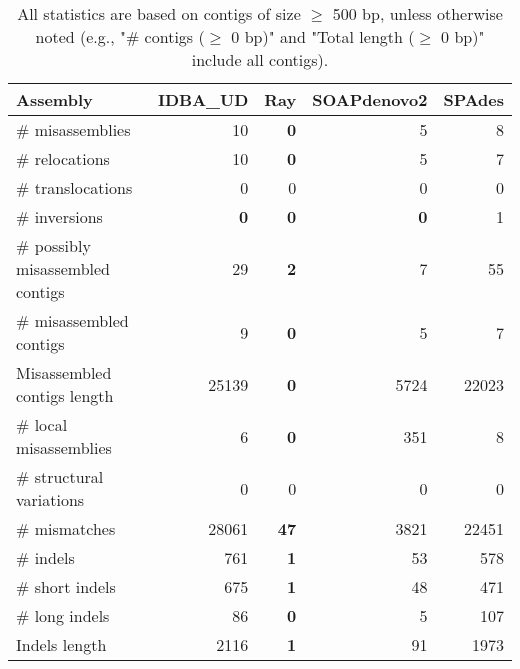 \documentclass[12pt,a4paper]{article}
\begin{document}
\begin{table}[ht]
\begin{center}
\caption{All statistics are based on contigs of size $\geq$ 500 bp, unless otherwise noted (e.g., "\# contigs ($\geq$ 0 bp)" and "Total length ($\geq$ 0 bp)" include all contigs).}
\begin{tabular}{|l*{4}{|r}|}
\hline
Assembly & IDBA\_UD & Ray & SOAPdenovo2 & SPAdes \\ \hline
\# misassemblies & 10 & {\bf 0} & 5 & 8 \\ \hline
\hspace{5mm}\# relocations & 10 & {\bf 0} & 5 & 7 \\ \hline
\hspace{5mm}\# translocations & 0 & 0 & 0 & 0 \\ \hline
\hspace{5mm}\# inversions & {\bf 0} & {\bf 0} & {\bf 0} & 1 \\ \hline
\# possibly misassembled contigs & 29 & {\bf 2} & 7 & 55 \\ \hline
\# misassembled contigs & 9 & {\bf 0} & 5 & 7 \\ \hline
Misassembled contigs length & 25139 & {\bf 0} & 5724 & 22023 \\ \hline
\# local misassemblies & 6 & {\bf 0} & 351 & 8 \\ \hline
\# structural variations & 0 & 0 & 0 & 0 \\ \hline
\# mismatches & 28061 & {\bf 47} & 3821 & 22451 \\ \hline
\# indels & 761 & {\bf 1} & 53 & 578 \\ \hline
\hspace{5mm}\# short indels & 675 & {\bf 1} & 48 & 471 \\ \hline
\hspace{5mm}\# long indels & 86 & {\bf 0} & 5 & 107 \\ \hline
Indels length & 2116 & {\bf 1} & 91 & 1973 \\ \hline
\end{tabular}
\end{center}
\end{table}
\end{document}
